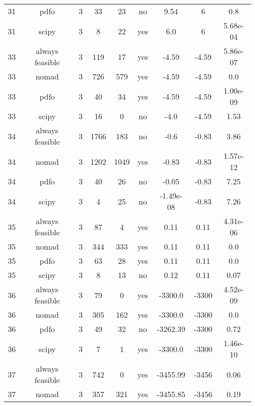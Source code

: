 \begin{footnotesize}
\begin{center}
\begin{longtable}{ccccccccc}
 31 &            pdfo &  3 &     33 &     23 &      no &        9.54 &           6 &      0.8\\
 31 &           scipy &  3 &      8 &     22 &     yes &         6.0 &           6 & 5.68e-04\\
 33 & always feasible &  3 &    119 &     17 &     yes &       -4.59 &       -4.59 & 5.86e-07\\
 33 &           nomad &  3 &    726 &    579 &     yes &       -4.59 &       -4.59 &      0.0\\
 33 &            pdfo &  3 &     40 &     34 &     yes &       -4.59 &       -4.59 & 1.00e-09\\
 33 &           scipy &  3 &     16 &      0 &      no &        -4.0 &       -4.59 &     1.53\\
 34 & always feasible &  3 &   1766 &    183 &      no &        -0.6 &       -0.83 &     3.86\\
 34 &           nomad &  3 &   1202 &   1049 &     yes &       -0.83 &       -0.83 & 1.57e-12\\
 34 &            pdfo &  3 &     40 &     26 &      no &       -0.05 &       -0.83 &     7.25\\
 34 &           scipy &  3 &      4 &     25 &      no &   -1.49e-08 &       -0.83 &     7.26\\
 35 & always feasible &  3 &     87 &      4 &     yes &        0.11 &        0.11 & 4.31e-06\\
 35 &           nomad &  3 &    344 &    333 &     yes &        0.11 &        0.11 &      0.0\\
 35 &            pdfo &  3 &     63 &     28 &     yes &        0.11 &        0.11 &      0.0\\
 35 &           scipy &  3 &      8 &     13 &      no &        0.12 &        0.11 &     0.07\\
 36 & always feasible &  3 &     79 &      0 &     yes &     -3300.0 &       -3300 & 4.52e-09\\
 36 &           nomad &  3 &    305 &    162 &     yes &     -3300.0 &       -3300 &      0.0\\
 36 &            pdfo &  3 &     49 &     32 &      no &    -3262.39 &       -3300 &     0.72\\
 36 &           scipy &  3 &      7 &      1 &     yes &     -3300.0 &       -3300 & 1.46e-10\\
 37 & always feasible &  3 &    742 &      0 &     yes &    -3455.99 &       -3456 &     0.06\\
 37 &           nomad &  3 &    357 &    321 &     yes &    -3455.85 &       -3456 &     0.19\\

\end{longtable}
\end{center}
\end{footnotesize}
